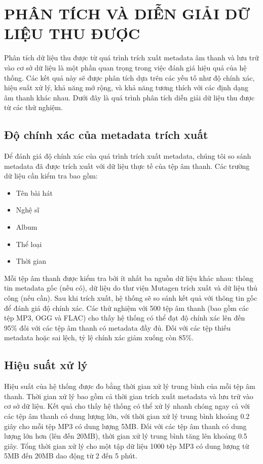 \documentclass[conference]{IEEEtran}
\begin{document}
\section{PHÂN TÍCH VÀ DIỄN GIẢI DỮ LIỆU THU ĐƯỢC}

Phân tích dữ liệu thu được từ quá trình trích xuất metadata âm thanh và lưu trữ vào cơ sở dữ liệu là một phần quan trọng trong việc đánh giá hiệu quả của hệ thống. Các kết quả này sẽ được phân tích dựa trên các yếu tố như độ chính xác, hiệu suất xử lý, khả năng mở rộng, và khả năng tương thích với các định dạng âm thanh khác nhau. Dưới đây là quá trình phân tích diễn giải dữ liệu thu được từ các thử nghiệm.

\subsection{Độ chính xác của metadata trích xuất}
Để đánh giá độ chính xác của quá trình trích xuất metadata, chúng tôi so sánh metadata đã được trích xuất với dữ liệu thực tế của tệp âm thanh. Các trường dữ liệu cần kiểm tra bao gồm:
\begin{itemize}
    \item Tên bài hát
    \item Nghệ sĩ
    \item Album
    \item Thể loại
    \item Thời gian
\end{itemize}
Mỗi tệp âm thanh được kiểm tra bởi ít nhất ba nguồn dữ liệu khác nhau: thông tin metadata gốc (nếu có), dữ liệu do thư viện Mutagen trích xuất và dữ liệu thủ công (nếu cần). Sau khi trích xuất, hệ thống sẽ so sánh kết quả với thông tin gốc để đánh giá độ chính xác. Các thử nghiệm với 500 tệp âm thanh (bao gồm các tệp MP3, OGG và FLAC) cho thấy hệ thống có thể đạt độ chính xác lên đến 95\% đối với các tệp âm thanh có metadata đầy đủ. Đối với các tệp thiếu metadata hoặc sai lệch, tỷ lệ chính xác giảm xuống còn 85\%.

\subsection{Hiệu suất xử lý}
Hiệu suất của hệ thống được đo bằng thời gian xử lý trung bình của mỗi tệp âm thanh. Thời gian xử lý bao gồm cả thời gian trích xuất metadata và lưu trữ vào cơ sở dữ liệu. Kết quả cho thấy hệ thống có thể xử lý nhanh chóng ngay cả với các tệp âm thanh có dung lượng lớn, với thời gian xử lý trung bình khoảng 0.2 giây cho mỗi tệp MP3 có dung lượng 5MB. Đối với các tệp âm thanh có dung lượng lớn hơn (lên đến 20MB), thời gian xử lý trung bình tăng lên khoảng 0.5 giây. Tổng thời gian xử lý cho một tập dữ liệu 1000 tệp MP3 có dung lượng từ 5MB đến 20MB dao động từ 2 đến 5 phút.
\end{document}
